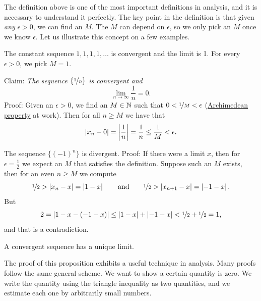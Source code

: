 The definition above is one of the most important definitions in analysis,
and it is necessary to understand it perfectly.  The key point in the
definition is that given \emph{any} $\epsilon > 0$, we can find an $M$.  The
$M$ can depend on $\epsilon$, so we only pick an $M$ once we know
$\epsilon$.  Let us illustrate this concept on a few examples.

\begin{example}
The constant sequence $1,1,1,1,\ldots$ is convergent and the limit is 1.  For
every $\epsilon > 0$, we pick $M = 1$.
\end{example}

\begin{example}
Claim: \emph{The sequence $\{ \nicefrac{1}{n} \}$ is convergent and}
\begin{equation*}
\lim_{n\to \infty} \frac{1}{n} = 0 .
\end{equation*}
Proof: Given an $\epsilon > 0$, we find an $M \in {\mathbb{N}}$ such that
$0 < \nicefrac{1}{M} < \epsilon$
(\hyperref[thm:arch:i]{Archimedean property} at work).
Then for all $n \geq M$ we have that
\begin{equation*}
\left\lvert {x_n - 0} \right\rvert = \left\lvert {\frac{1}{n}} \right\rvert = \frac{1}{n} \leq \frac{1}{M} < \epsilon .
\end{equation*}
\end{example}

\begin{example}
The sequence $\{ {(-1)}^n \}$ is divergent.  Proof: If there
were a limit $x$, then for $\epsilon = \frac{1}{2}$ we expect an $M$ that
satisfies the definition.  Suppose
such an $M$ exists, then for an even $n \geq M$ we compute
\begin{equation*}
\nicefrac{1}{2} > \left\lvert {x_n - x} \right\rvert  = \left\lvert {1 - x} \right\rvert
\qquad \text{and} \qquad
\nicefrac{1}{2} > \left\lvert {x_{n+1} - x} \right\rvert  = \left\lvert {-1 - x} \right\rvert .
\end{equation*}
But
\begin{equation*}
2 = \left\lvert {1 - x - (-1 -x)} \right\rvert \leq
\left\lvert {1 - x} \right\rvert + \left\lvert {-1 -x} \right\rvert < \nicefrac{1}{2} + \nicefrac{1}{2} = 1 ,
\end{equation*}
and that is a contradiction.
\end{example}

\begin{prop} \label{prop:limisunique}
A convergent sequence has a unique limit.
\end{prop}

The proof of this proposition exhibits a useful technique in
analysis.  Many proofs follow the same general scheme.  We want to
show a certain quantity is zero.  We write the quantity using the 
triangle inequality as two quantities, and we estimate each one
by arbitrarily small numbers.

